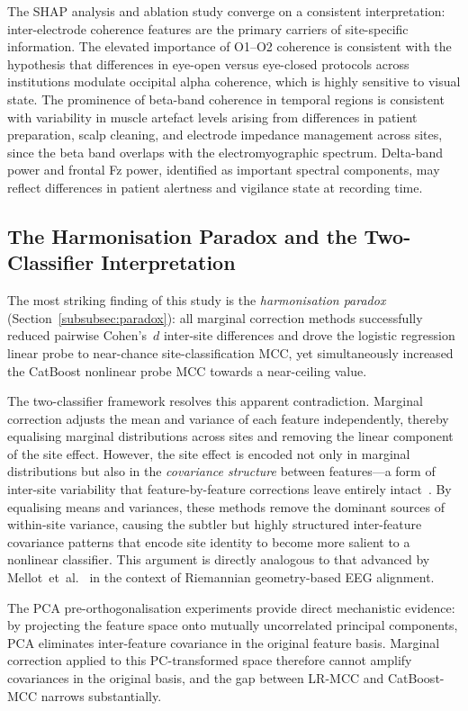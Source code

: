 \documentclass[preprint,12pt]{elsarticle}
\begin{document}
The SHAP analysis and ablation study converge on a consistent
interpretation: inter-electrode coherence features are the primary
carriers of site-specific information.
The elevated importance of O1--O2 coherence is consistent with the
hypothesis that differences in eye-open versus eye-closed protocols
across institutions modulate occipital alpha coherence, which is
highly sensitive to visual state.
The prominence of beta-band coherence in temporal regions is
consistent with variability in muscle artefact levels arising from
differences in patient preparation, scalp cleaning, and electrode
impedance management across sites, since the beta band overlaps with
the electromyographic spectrum.
Delta-band power and frontal Fz power, identified as important
spectral components, may reflect differences in patient alertness and
vigilance state at recording time.

\subsection{The Harmonisation Paradox and the Two-Classifier
  Interpretation}
\label{subsec:disc_paradox}

The most striking finding of this study is the \emph{harmonisation
paradox} (Section~\ref{subsubsec:paradox}): all marginal correction
methods successfully reduced pairwise Cohen's~$d$ inter-site
differences and drove the logistic regression linear probe to
near-chance site-classification MCC, yet simultaneously increased the
CatBoost nonlinear probe MCC towards a near-ceiling value.

The two-classifier framework resolves this apparent contradiction.
Marginal correction adjusts the mean and variance of each feature
independently, thereby equalising marginal distributions across sites
and removing the linear component of the site effect.
However, the site effect is encoded not only in marginal distributions
but also in the \emph{covariance structure} between features---a form
of inter-site variability that feature-by-feature corrections leave
entirely intact~\cite{hu2023image}.
By equalising means and variances, these methods remove the dominant
sources of within-site variance, causing the subtler but highly
structured inter-feature covariance patterns that encode site identity
to become more salient to a nonlinear classifier.
This argument is directly analogous to that advanced by
Mellot~et~al.~\cite{mellot2023meeg} in the context of Riemannian
geometry-based EEG alignment.

The PCA pre-orthogonalisation experiments provide direct mechanistic
evidence: by projecting the feature space onto mutually uncorrelated
principal components, PCA eliminates inter-feature covariance in the
original feature basis.
Marginal correction applied to this PC-transformed space therefore
cannot amplify covariances in the original basis, and the gap between
LR-MCC and CatBoost-MCC narrows substantially.
\end{document}
